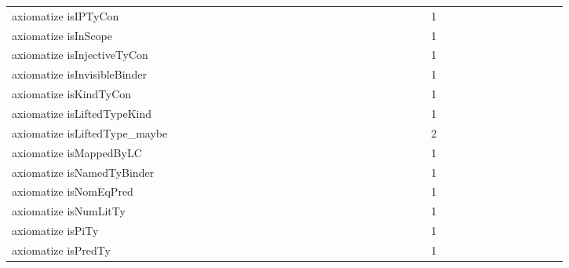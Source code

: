 {\begin{tabular}{l|rrr|rrr|rrr}
axiomatize isIPTyCon &  &  &  &  &  &  &  &  &  &  &  &  &  &  &  &  &  &  &  &  &  &  &  & 1 &  &  &  &  &  &  &  &  &  &  &  & \\
axiomatize isInScope &  &  &  &  &  &  &  &  &  &  &  &  &  &  &  &  &  &  &  &  &  &  &  & 1 &  &  &  &  &  &  &  &  &  &  &  & \\
axiomatize isInjectiveTyCon &  &  &  &  &  &  &  &  &  &  &  &  &  &  &  &  &  &  &  &  &  &  &  & 1 &  &  &  &  &  &  &  &  &  &  &  & \\
axiomatize isInvisibleBinder &  &  &  &  &  &  &  &  &  &  &  &  &  &  &  &  &  &  &  &  &  &  &  & 1 &  &  &  &  &  &  &  &  &  &  &  & \\
axiomatize isKindTyCon &  &  &  &  &  &  &  &  &  &  &  &  &  &  &  &  &  &  &  &  &  &  &  & 1 &  &  &  &  &  &  &  &  &  &  &  & \\
axiomatize isLiftedTypeKind &  &  &  &  &  &  &  &  &  &  &  &  &  &  &  &  &  &  &  &  &  &  &  & 1 &  &  &  &  &  &  &  &  &  &  &  & \\
axiomatize isLiftedType_maybe &  &  &  &  &  &  &  &  &  &  &  &  &  &  &  &  &  &  &  &  &  &  &  & 2 &  &  &  &  &  &  &  &  &  &  &  & \\
axiomatize isMappedByLC &  &  &  &  &  &  &  &  &  &  &  &  &  &  &  &  &  &  &  &  &  &  &  & 1 &  &  &  &  &  &  &  &  &  &  &  & \\
axiomatize isNamedTyBinder &  &  &  &  &  &  &  &  &  &  &  &  &  &  &  &  &  &  &  &  &  &  &  & 1 &  &  &  &  &  &  &  &  &  &  &  & \\
axiomatize isNomEqPred &  &  &  &  &  &  &  &  &  &  &  &  &  &  &  &  &  &  &  &  &  &  &  & 1 &  &  &  &  &  &  &  &  &  &  &  & \\
axiomatize isNumLitTy &  &  &  &  &  &  &  &  &  &  &  &  &  &  &  &  &  &  &  &  &  &  &  & 1 &  &  &  &  &  &  &  &  &  &  &  & \\
axiomatize isPiTy &  &  &  &  &  &  &  &  &  &  &  &  &  &  &  &  &  &  &  &  &  &  &  & 1 &  &  &  &  &  &  &  &  &  &  &  & \\
axiomatize isPredTy &  &  &  &  &  &  &  &  &  &  &  &  &  &  &  &  &  &  &  &  &  &  &  & 1 &  &  &  &  &  &  &  &  &  &  &  & \\

\end{tabular}}
